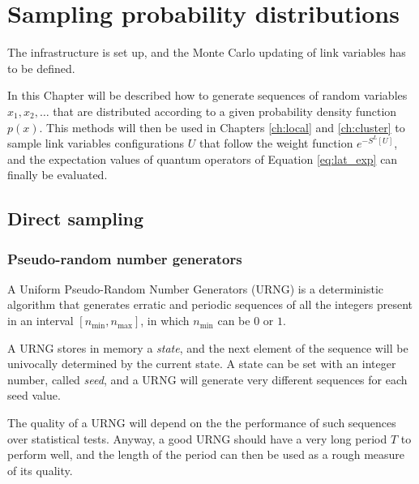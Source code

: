 \chapter{Sampling probability distributions}\label{ch:mc}

The infrastructure is set up, and the Monte Carlo updating of link variables has to be defined.

In this Chapter will be described how to generate sequences of random variables $x_1, x_2, \ldots$ that are distributed according to a given probability density function $p(x)$.
This methods will then be used in Chapters \ref{ch:local} and \ref{ch:cluster} to sample link variables configurations ${U}$ that follow the weight function $e^{-S^L[U]}$,
and the expectation values of quantum operators of Equation \eqref{eq:lat_exp} can finally be evaluated.

%
%

\section{Direct sampling}
\subsection*{Pseudo-random number generators}
A Uniform Pseudo-Random Number Generators (URNG) is a deterministic algorithm that generates erratic and periodic
sequences of all the integers present in an interval $[n_\mathrm{min},n_\mathrm{max}]$, in which $n_\mathrm{min}$ can be $0$ or $1$.

A URNG stores in memory a \emph{state}, and the next element of the sequence will be univocally determined by the current state.
A state can be set with an integer number, called \emph{seed}, and a URNG will generate very different sequences for each seed value. 

The quality of a URNG will depend on the the performance of such sequences over statistical tests.
Anyway, a good URNG should have a very long period $T$ to perform well,
and the length of the period can then be used as a rough measure of its quality.

